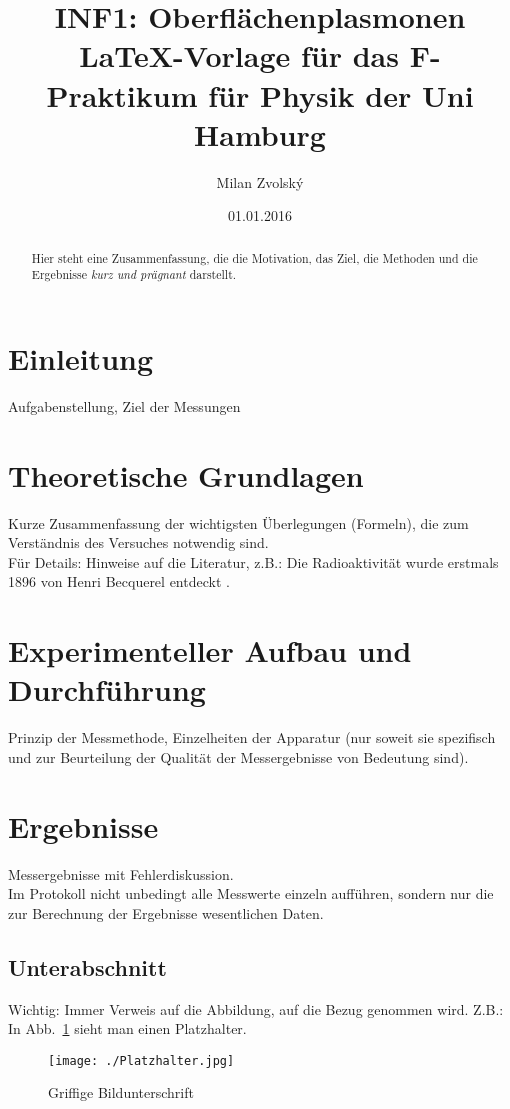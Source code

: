 \documentclass[12pt]{article}
\title{INF1: Oberfl\"achenplasmonen\\ \LaTeX-Vorlage f\"ur das F-Praktikum f\"ur Physik der Uni Hamburg}
\author{Milan Zvolsk\'y}
\date{01.01.2016}
\begin{document}
\maketitle
\thispagestyle{empty}
\clearpage

\begin{abstract}
Hier steht eine Zusammenfassung, die die Motivation, das Ziel, die Methoden und die Ergebnisse \emph{kurz und pr\"agnant} darstellt.
\end{abstract}

\section{Einleitung}
Aufgabenstellung, Ziel der Messungen

\section{Theoretische Grundlagen}
Kurze Zusammenfassung der wichtigsten \"Uberlegungen (Formeln), die zum Verst\"andnis des Versuches notwendig sind.\\
F\"ur Details: Hinweise auf die Literatur, z.B.:
Die Radioaktivit\"at wurde erstmals 1896 von Henri Becquerel entdeckt \cite{Becquerel:261888}.


\section{Experimenteller Aufbau und Durchf\"uhrung}
Prinzip der Messmethode, Einzelheiten der Apparatur (nur soweit sie spezifisch und zur Beurteilung der Qualit\"at der Messergebnisse von Bedeutung sind).

\section{Ergebnisse}
Messergebnisse mit Fehlerdiskussion.\\
Im Protokoll nicht unbedingt alle Messwerte einzeln auff\"uhren, sondern nur die zur Berechnung der Ergebnisse wesentlichen Daten. \\


\subsection{Unterabschnitt}
Wichtig: Immer Verweis auf die Abbildung, auf die Bezug genommen wird.
Z.B.: In Abb.~\ref{meinlabel1} sieht man einen Platzhalter.

\begin{figure}[h!]
  \centering
  \texttt{[image: ./Platzhalter.jpg]}
  \caption{Griffige Bildunterschrift}
  \label{meinlabel1}
\end{figure}
\end{document}
